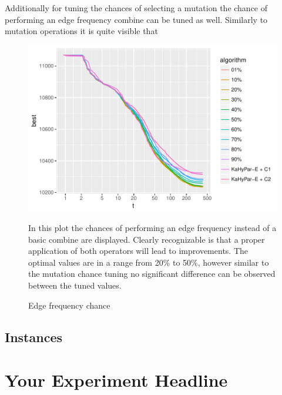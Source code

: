 \documentclass[a4paper,12pt,bibtotoc,titlepage, liststotoc,BCOR7mm,headsepline,pointlessnumbers]{scrbook}
\numberwithin{equation}{section}
\begin{document}
Additionally for tuning the chances of selecting a mutation the chance of performing an edge frequency combine can be tuned as well. Similarly to mutation operations it is quite visible that 

\begin{figure}[H]
\caption{Edge frequency chance}
\begin{center}
\includegraphics{bachelorarbeit-edgefrequencytuning}
\end{center}
In this plot the chances of performing an edge frequency instead of a basic combine are displayed. Clearly recognizable is that a proper application of both operators will lead to improvements. The optimal values are in a range from 20\% to 50\%, however similar to the mutation chance tuning no significant difference can be observed between the tuned values.  
\end{figure}
\subsection{Instances}

\section{Your Experiment Headline}
\end{document}
